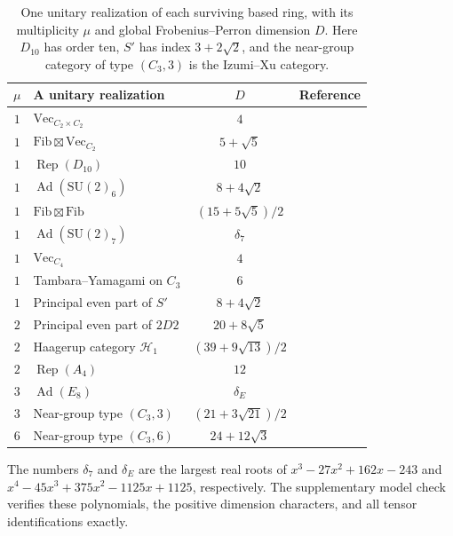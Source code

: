 \documentclass[11pt,a4paper]{article}
\theoremstyle{definition}\newtheorem{definition}[theorem]{Definition}
\theoremstyle{remark}\newtheorem{remark}[theorem]{Remark}
\numberwithin{equation}{section}
\begin{document}
\begin{table}[htbp]
\centering\small
\begin{tabular}{@{}clcl@{}}
\toprule
$\mu$ & A unitary realization & $D$ & Reference \\
\midrule
$1$ & $\mathrm{Vec}_{C_2\times C_2}$ & $4$ & \cite[\S3.4]{LPR} \\
$1$ & $\mathrm{Fib}\boxtimes\mathrm{Vec}_{C_2}$ & $5+\sqrt{5}$ & \cite[\S3.4]{LPR} \\
$1$ & $\operatorname{Rep}(D_{10})$ & $10$ & \cite[\S3.4]{LPR} \\
$1$ & $\operatorname{Ad}(\mathrm{SU}(2)_6)$ & $8+4\sqrt{2}$ & \cite[Theorem 3.1]{EIP} \\
$1$ & $\mathrm{Fib}\boxtimes\mathrm{Fib}$ & $(15+5\sqrt{5})/2$ & \cite[\S3.4]{LPR} \\
$1$ & $\operatorname{Ad}(\mathrm{SU}(2)_7)$ & $\delta_7$ & \cite[\S3.4]{LPR} \\
$1$ & $\mathrm{Vec}_{C_4}$ & $4$ & \cite[\S3.4]{LPR} \\
$1$ & Tambara--Yamagami on $C_3$ & $6$ & \cite{TambaraYamagami} \\
$1$ & Principal even part of $S'$ & $8+4\sqrt{2}$ & \cite[Theorem 1]{LMP} \\
$2$ & Principal even part of $2D2$ & $20+8\sqrt{5}$ & \cite[Theorem 3.1]{EIP} \\
$2$ & Haagerup category $\mathcal H_1$ & $(39+9\sqrt{13})/2$ & \cite[Table 2]{GrossmanSnyder} \\
$2$ & $\operatorname{Rep}(A_4)$ & $12$ & \cite[Theorem 1.1]{Larson} \\
$3$ & $\operatorname{Ad}(E_8)$ & $\delta_E$ & \cite{IzumiE8,EvansJones} \\
$3$ & Near-group type $(C_3,3)$ & $(21+3\sqrt{21})/2$ & \cite[Example 9.4]{Izumi} \\
$6$ & Near-group type $(C_3,6)$ & $24+12\sqrt{3}$ & \cite[Theorem 10.19]{Izumi} \\
\bottomrule
\end{tabular}
\caption{One unitary realization of each surviving based ring, with its
multiplicity $\mu$ and global Frobenius--Perron dimension $D$.
Here $D_{10}$ has order ten, $S'$ has index $3+2\sqrt2$, and the
near-group category of type $(C_3,3)$ is the Izumi--Xu category.}
\label{finite:tab:models}
\smallskip
\begin{minipage}{\textwidth}\footnotesize
The numbers $\delta_7$ and $\delta_E$ are the largest real roots of
$x^3-27x^2+162x-243$ and
$x^4-45x^3+375x^2-1125x+1125$, respectively.
The supplementary model check verifies these polynomials, the positive
dimension characters, and all tensor identifications exactly.
\end{minipage}
\end{table}
\end{document}
